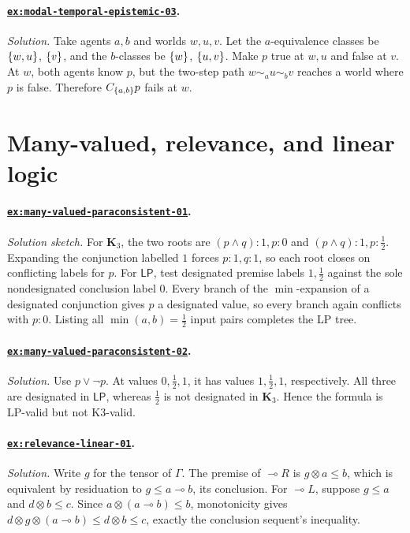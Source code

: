 \documentclass[11pt,oneside,openany]{book}
\theoremstyle{definition}
\theoremstyle{plain}
\theoremstyle{remark}
\DeclarePairedDelimiter{\set}{\lbrace}{\rbrace}
\begin{document}
\paragraph{\hyperref[ex:modal-temporal-epistemic-03]{\texttt{ex:modal-temporal-epistemic-03}}.}
\textit{Solution.}  Take agents \(a,b\) and worlds \(w,u,v\).  Let the
\(a\)-equivalence classes be \(\set{w,u}\), \(\set v\), and the
\(b\)-classes be \(\set w\), \(\set{u,v}\).  Make \(p\) true at \(w,u\) and
false at \(v\).  At \(w\), both agents know \(p\), but the two-step path
\(w\sim_a u\sim_b v\) reaches a world where \(p\) is false.  Therefore
\(C_{\set{a,b}}p\) fails at \(w\).

\section{Many-valued, relevance, and linear logic}

\paragraph{\hyperref[ex:many-valued-paraconsistent-01]{\texttt{ex:many-valued-paraconsistent-01}}.}
\textit{Solution sketch.}  For \(\mathbf K_3\), the two roots are
\((p\land q){:}1,p{:}0\) and
\((p\land q){:}1,p{:}\tfrac12\).  Expanding the conjunction labelled \(1\)
forces \(p{:}1,q{:}1\), so each root closes on conflicting labels for \(p\).
For \(\mathsf{LP}\), test designated premise labels \(1,\tfrac12\) against
the sole nondesignated conclusion label \(0\).  Every branch of the
\(\min\)-expansion of a designated conjunction gives \(p\) a designated
value, so every branch again conflicts with \(p{:}0\).  Listing all
\(\min(a,b)=\tfrac12\) input pairs completes the LP tree.

\paragraph{\hyperref[ex:many-valued-paraconsistent-02]{\texttt{ex:many-valued-paraconsistent-02}}.}
\textit{Solution.}  Use \(p\lor\neg p\).  At values \(0,\tfrac12,1\), it has
values \(1,\tfrac12,1\), respectively.  All three are designated in
\(\mathsf{LP}\), whereas \(\tfrac12\) is not designated in
\(\mathbf K_3\).  Hence the formula is LP-valid but not K3-valid.

\paragraph{\hyperref[ex:relevance-linear-01]{\texttt{ex:relevance-linear-01}}.}
\textit{Solution.}  Write \(g\) for the tensor of \(\Gamma\).  The premise of
\(\multimap R\) is \(g\otimes a\leq b\), which is equivalent by residuation to
\(g\leq a\multimap b\), its conclusion.  For \(\multimap L\), suppose
\(g\leq a\) and \(d\otimes b\leq c\).  Since
\(a\otimes(a\multimap b)\leq b\), monotonicity gives
\(d\otimes g\otimes(a\multimap b)\leq d\otimes b\leq c\), exactly the
conclusion sequent's inequality.
\end{document}
